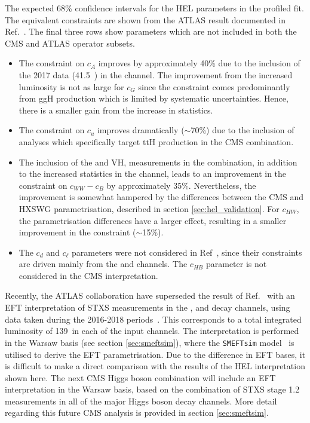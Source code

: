 \begin{table}[htb]
  \centering
  \renewcommand{\arraystretch}{1.3}
  \setlength{\tabcolsep}{15pt}
  \caption[Comparison to the HEL parameter constraints from a previous ATLAS result]
  {
    The expected 68\% confidence intervals for the HEL parameters in the profiled fit. The equivalent constraints are shown from the ATLAS result documented in Ref.~\cite{ATL-PHYS-PUB-2017-018}. The final three rows show parameters which are not included in both the CMS and ATLAS operator subsets.
  }
  \label{tab:hel_atlas}
  
\end{table}

\begin{itemize}
    \item The constraint on $c_A$ improves by approximately 40\% due to the inclusion of the 2017 data (41.5~\fbinv) in the \Hgg channel. The improvement from the increased luminosity is not as large for $c_G$ since the constraint comes predominantly from ggH production which is limited by systematic uncertainties. Hence, there is a smaller gain from the increase in statistics.
    \item The constraint on $c_u$ improves dramatically ($\sim$70\%) due to the inclusion of analyses which specifically target ttH production in the CMS combination. 
    \item The inclusion of the \HWW and VH, \Hbb measurements in the combination, in addition to the increased statistics in the \Hfl channel, leads to an improvement in the constraint on $c_{WW}-c_B$ by approximately 35\%. Nevertheless, the improvement is somewhat hampered by the differences between the CMS and HXSWG parametrisation, described in section \ref{sec:hel_validation}. For $c_{HW}$, the parametrisation differences have a larger effect, resulting in a smaller improvement in the constraint ($\sim$15\%).
    \item The $c_d$ and $c_\ell$ parameters were not considered in Ref~\cite{ATL-PHYS-PUB-2017-018}, since their constraints are driven mainly from the \Hbb and \Htautau channels. The $c_{HB}$ parameter is not considered in the CMS interpretation.
\end{itemize}

Recently, the ATLAS collaboration have superseded the result of Ref.~\cite{ATL-PHYS-PUB-2017-018} with an EFT interpretation of STXS measurements in the \Hbb, \Hgg and \Hfl decay channels, using data taken during the 2016-2018 periods~\cite{ATLAS-CONF-2020-053}. This corresponds to a total integrated luminosity of 139~\fbinv in each of the input channels. The interpretation is performed in the Warsaw basis (see section \ref{sec:smeftsim}), where the \texttt{SMEFTsim} model~\cite{} is utilised to derive the EFT parametrisation. Due to the difference in EFT bases, it is difficult to make a direct comparison with the results of the HEL interpretation shown here. The next CMS Higgs boson combination will include an EFT interpretation in the Warsaw basis, based on the combination of STXS stage 1.2 measurements in all of the major Higgs boson decay channels. More detail regarding this future CMS analysis is provided in section \ref{sec:smeftsim}.

